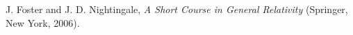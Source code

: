 \documentclass[12pt,a4paper,titlepage,brazil]{article}
\begin{document}
\begin{thebibliography}{99}
  J. Foster and J. D. Nightingale, {\em A Short Course in General Relativity} (Springer, New York, 2006).

\end{thebibliography}
\end{document}
